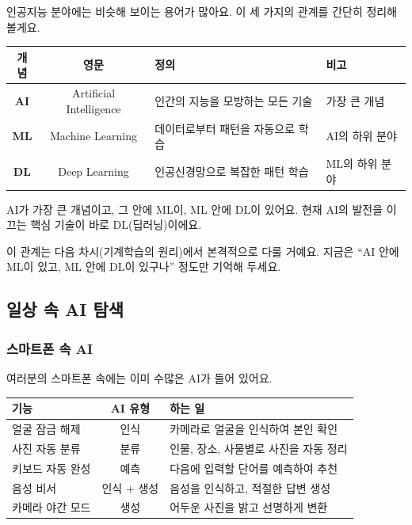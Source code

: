 \documentclass[11pt,a4paper]{article}
\begin{document}
인공지능 분야에는 비슷해 보이는 용어가 많아요. 이 세 가지의 관계를 간단히 정리해 볼게요.

\begin{center}
\begin{tabular}{|c|c|p{5.5cm}|p{3cm}|}
\hline
\rowcolor{tableheader}
\textbf{개념} & \textbf{영문} & \textbf{정의} & \textbf{비고} \\
\hline
\textbf{AI} & Artificial Intelligence & 인간의 지능을 모방하는 모든 기술 & 가장 큰 개념 \\
\hline
\textbf{ML} & Machine Learning & 데이터로부터 패턴을 자동으로 학습 & AI의 하위 분야 \\
\hline
\textbf{DL} & Deep Learning & 인공신경망으로 복잡한 패턴 학습 & ML의 하위 분야 \\
\hline
\end{tabular}
\end{center}

\begin{definitionbox}
AI가 가장 큰 개념이고, 그 안에 ML이, ML 안에 DL이 있어요. 현재 AI의 발전을 이끄는 핵심 기술이 바로 DL(딥러닝)이에요.
\end{definitionbox}

이 관계는 다음 차시(기계학습의 원리)에서 본격적으로 다룰 거예요. 지금은 ``AI 안에 ML이 있고, ML 안에 DL이 있구나'' 정도만 기억해 두세요.



\subsection{일상 속 AI 탐색}

\subsubsection{스마트폰 속 AI}

여러분의 스마트폰 속에는 이미 수많은 AI가 들어 있어요.

\begin{center}
\begin{tabular}{|p{3cm}|c|p{7.5cm}|}
\hline
\rowcolor{tableheader}
\textbf{기능} & \textbf{AI 유형} & \textbf{하는 일} \\
\hline
얼굴 잠금 해제 & 인식 & 카메라로 얼굴을 인식하여 본인 확인 \\
\hline
사진 자동 분류 & 분류 & 인물, 장소, 사물별로 사진을 자동 정리 \\
\hline
키보드 자동 완성 & 예측 & 다음에 입력할 단어를 예측하여 추천 \\
\hline
음성 비서 & 인식 + 생성 & 음성을 인식하고, 적절한 답변 생성 \\
\hline
카메라 야간 모드 & 생성 & 어두운 사진을 밝고 선명하게 변환 \\
\hline
\end{tabular}
\end{center}
\end{document}
